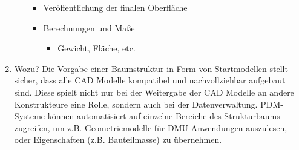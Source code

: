 \documentclass[10pt,a4paper,fleqn]{article}
\begin{document}
\begin{enumerate}
\begin{itemize}
\begin{itemize}
\begin{itemize}
						\end{itemize}
					\item Veröffentlichung der finalen Oberfläche
					\item Berechnungen und Maße
						\begin{itemize}
							\item Gewicht, Fläche, etc.
						\end{itemize}
				\end{itemize}
		\end{itemize}
	\item Wozu?
	Die Vorgabe einer Baumstruktur in Form von Startmodellen stellt sicher, dass alle CAD Modelle kompatibel und nachvollziehbar aufgebaut sind. Diese spielt nicht nur bei der Weitergabe der CAD Modelle an andere Konstrukteure eine Rolle, sondern auch bei der Datenverwaltung. PDM-Systeme können automatisiert auf einzelne Bereiche des Strukturbaums zugreifen, um z.B. Geometriemodelle für DMU-Anwendungen auszulesen, oder Eigenschaften (z.B. Bauteilmasse) zu übernehmen. 

\end{enumerate}
\end{document}
